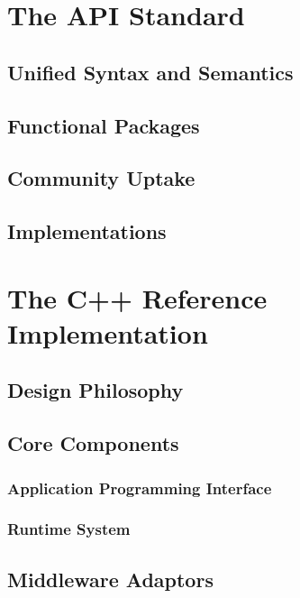 \documentclass[a4paper,10pt]{article}
\begin{document}
 
 
 \section{The API Standard}

 \subsection{Unified Syntax and Semantics}
 
 \subsection{Functional Packages}

 \subsection{Community Uptake}
 
 \subsection{Implementations}

 \section{The C++ Reference Implementation}
 
 \subsection{Design Philosophy}

 \subsection{Core Components}

 \subsubsection{Application Programming Interface}

 \subsubsection{Runtime System}

 \subsection{Middleware Adaptors}
\end{document}

